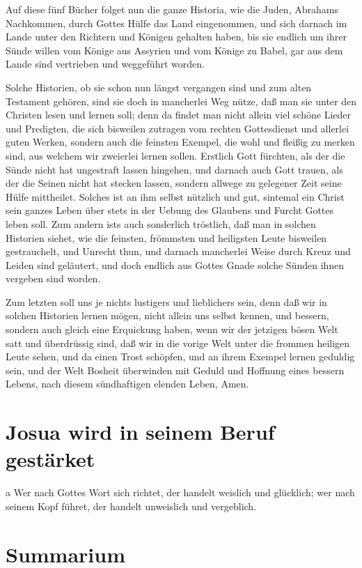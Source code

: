 Auf diese fünf Bücher folget nun die ganze Historia, wie die Juden, Abrahams Nachkommen, durch Gottes Hülfe das Land eingenommen, und sich darnach im Lande unter den Richtern und Königen gehalten haben, bis sie endlich um ihrer Sünde willen vom Könige aus Assyrien und vom Könige zu Babel, gar aus dem Lande sind vertrieben und weggeführt worden.

Solche Historien, ob sie schon nun längst vergangen sind und zum alten Testament gehören, sind sie doch in mancherlei Weg nütze, daß man sie unter den Christen lesen und lernen soll; denn da findet man nicht allein viel schöne Lieder und Predigten, die sich bisweilen zutragen vom rechten Gottesdienst und allerlei guten Werken, sondern auch die feinsten Exempel, die wohl und fleißig zu merken sind, aus welchem wir zweierlei lernen sollen. Erstlich Gott fürchten, als der die Sünde nicht hat ungestraft lassen hingehen, und darnach auch Gott trauen, als der die Seinen nicht hat stecken lassen, sondern allwege zu gelegener Zeit seine Hülfe mittheilet. Solches ist an ihm selbst nützlich und gut, sintemal ein Christ sein ganzes Leben über stets in der Uebung des Glaubens und Furcht Gottes leben soll. Zum andern ists auch sonderlich tröstlich, daß man in solchen Historien siehet, wie die feinsten, frömmsten und heiligsten Leute bisweilen gestrauchelt, und Unrecht thun, und darnach mancherlei Weise durch Kreuz und Leiden sind geläutert, und doch endlich aus Gottes Gnade solche Sünden ihnen vergeben sind worden.

Zum letzten soll uns je nichts lustigers und lieblichers sein, denn daß wir in solchen Historien lernen mögen, nicht allein uns selbst kennen, und bessern, sondern auch gleich eine Erquickung haben, wenn wir der jetzigen bösen Welt satt und überdrüssig sind, daß wir in die vorige Welt unter die frommen heiligen Leute sehen, und da einen Trost schöpfen, und an ihrem Exempel lernen geduldig sein, und der Welt Bosheit überwinden mit Geduld und Hoffnung eines bessern Lebens, nach diesem sündhaftigen elenden Leben, Amen.

\section{Josua wird in seinem Beruf gestärket}

a Wer nach Gottes Wort sich richtet, der handelt weislich und glücklich; wer nach seinem Kopf führet, der handelt unweislich und vergeblich.
\section{Summarium}

